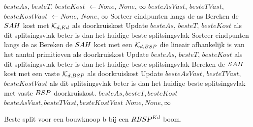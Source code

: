 
\begin{dutchalgorithm}
    \begin{algorithmic}       
            \State $besteAs$, $besteT$, $besteKost$ $\gets None$, $None$, $\infty$
            \State $besteAsVast$, $besteTVast$, $besteKostVast$ $\gets None$, $None$, $\infty$
                \State Sorteer eindpunten langs de as
                    \State Bereken de $SAH$ kost met $\mathcal{K}_{d,Kd}$ als doorkruiskost
                    \State Update $besteAs$, $besteT$, $besteKost$ als dit splitsingsvlak beter is dan het huidige beste splitsingsvlak
                \EndFor        
            \EndFor
                \State Sorteer eindpunten langs de as
                    \State Bereken de $SAH$ kost met een $\mathcal{K}_{d,BSP}$ die lineair afhankelijk is van het aantal primitieven als doorkruiskost
                    \State Update $besteAs$, $besteT$, $besteKost$ als dit splitsingsvlak beter is dan het huidige beste splitsingsvlak    
                    \State Bereken de $SAH$ kost met een vaste $\mathcal{K}_{d,BSP}$ als doorkruiskost
                    \State Update $besteAsVast$, $besteTVast$, $besteKostVast$ als dit splitsingsvlak beter is dan het huidige beste splitsingsvlak met vaste $BSP$ doorkruiskost.   
                \EndFor                 
            \EndFor
                \State \Return $besteAs, besteT, besteKost$
            \EndIf
                \State \Return $besteAsVast, besteTVast, besteKostVast$
            \EndIf
            \State \Return $None, None, \infty$
        \EndFunction
    \end{algorithmic}
    \caption{Beste split voor een bouwknoop b bij een $RBSP^{Kd}$ boom.}
    \label{alg:rbspkd-beste-split}
\end{dutchalgorithm}

